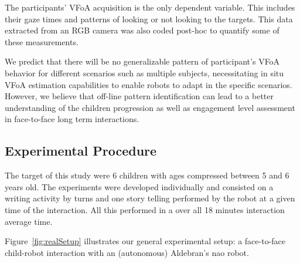 \documentclass{sig-alternate}
\begin{document}
The participants' VFoA acquisition is the only dependent variable. This includes
their gaze times and patterns of looking or not looking to the targets. This
data extracted from an RGB camera was also coded post-hoc to quantify some of
these measurements.

We predict that there will be no generalizable pattern of participant's VFoA
behavior for different scenarios such as multiple subjects, necessitating in
situ VFoA estimation capabilities to enable robots to adapt in the specific
scenarios. However, we believe that off-line pattern identification can lead to
a better understanding of the children progression as well as engagement level
assessment in face-to-face long term interactions.




\subsection{Experimental Procedure}

The target of this study were 6 children with ages compressed between 5 and 6
years old. The experiments were developed individually and consisted on a
writing activity by turns and one story telling performed by the robot at a
given time of the interaction. All this performed in a over all 18 minutes
interaction average time.

Figure~\ref{fig:realSetup} illustrates our general experimental setup: a
face-to-face child-robot interaction with an (autonomous) Aldebran's {\sc nao}
robot.
\end{document}
